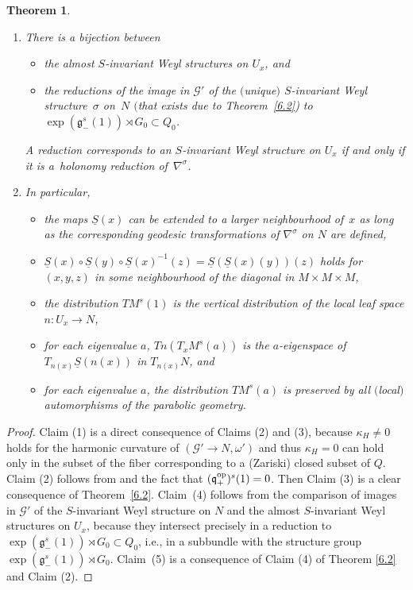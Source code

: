 \documentclass[pdftex]{sigma}
\newcommand{\om}{\omega}
\newcommand{\si}{\sigma}
\newcommand{\un}{\underline}
\newcommand{\ba}{\mathcal{G}}
\newcommand{\fg}{\mathfrak g}
\newcommand{\fv}{\mathfrak q}
\newcommand{\fp}{\mathfrak p}
\newcommand{\fl}{\mathfrak l}
\numberwithin{equation}{section}
\newtheorem{Theorem}{Theorem}[section]
\begin{document}
\begin{Theorem}
\begin{enumerate}
The pseudo-group generated by all local $s$-symmetries is locally transitive at $x$ if and only if $\fv/\fp\subset \fl/(\fl\cap \fp)$, i.e., if and only if $(R^\si(n(x)))_\si$ spans the whole $\fv/\fp$.
\item[$4.$] There is a bijection between
\begin{itemize}\itemsep=0pt
\item the almost $S$-invariant Weyl structures on $U_x$, and
\item the reductions of the image in $\ba'$ of the $($unique$)$ $S$-invariant Weyl structure~$\si$ on~$N$ $($that exists due to Theorem~{\rm \ref{6.2})} to $\exp(\fg_-^s(1))\rtimes G_0\subset Q_0$.
\end{itemize}
A reduction corresponds to an $S$-invariant Weyl structure on $U_x$ if and only if it is a~holonomy reduction of~$\nabla^\si$.
\item[$5.$] In particular,
\begin{itemize}\itemsep=0pt
\item the maps $\un S(x)$ can be extended to a larger neighbourhood of~$x$ as long as the corresponding geodesic transformations of $\nabla^\si$ on $N$ are defined,
\item $\un S(x)\circ \un S(y)\circ \un S(x)^{-1}(z)=\un S({\un S(x)(y)})(z)$ holds for $(x,y,z)$ in some neighbourhood of the diagonal in $M\times M\times M$,
\item the distribution $TM^s(1)$ is the vertical distribution of the local leaf space $n\colon U_x\to N$,
\item for each eigenvalue $a$, $Tn(T_xM^s(a))$ is the $a$-eigenspace of $T_{n(x)}\un S(n(x))$ in $T_{n(x)}N$, and
\item for each eigenvalue $a$, the distribution $TM^s(a)$ is preserved by all $($local$)$ automorphisms of the parabolic geometry.
\end{itemize}
\end{enumerate}
\end{Theorem}
\begin{proof}
Claim (1) is a direct consequence of Claims (2) and (3), because $\kappa_H\neq 0$ holds for the harmonic curvature of $(\ba'\to N,\om')$ and thus $\kappa_H=0$ can hold only in the subset of the f\/iber corresponding to a (Zariski) closed subset of $Q$. Claim (2) follows from \cite[Theorem~3.3]{cap-cor} and the fact that $(\fv^{\rm op}_+)^s(1)=0$. Then Claim (3) is a clear consequence of Theorem~\ref{6.2}. Claim~(4) follows from the comparison of images in $\ba'$ of the $S$-invariant Weyl structure on $N$ and the almost $S$-invariant Weyl structures on $U_x$, because they intersect precisely in a reduction to $\exp(\fg_-^s(1))\rtimes G_0\subset Q_0$, i.e., in a subbundle with the structure group $\exp(\fg_-^s(1))\rtimes G_0$. Claim~(5) is a consequence of Claim (4) of Theorem \ref{6.2} and Claim (2).
\end{proof}
\end{document}
